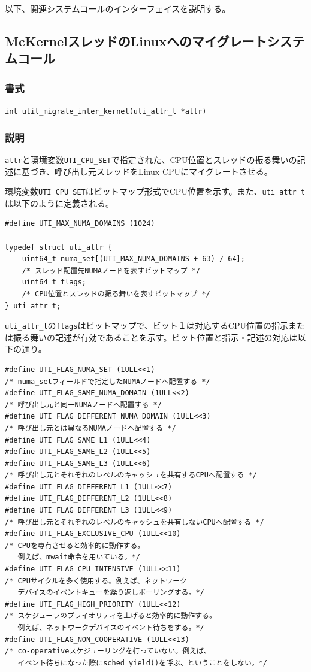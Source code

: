 \documentclass[twoside,11pt,fleqn]{book}
\begin{document}
以下、関連システムコールのインターフェイスを説明する。

\subsection{McKernelスレッドのLinuxへのマイグレートシステムコール}
\subsubsection*{書式}{\quad} \texttt{int util\_migrate\_inter\_kernel(uti\_attr\_t *attr)}
\subsubsection*{説明}{\quad}
\texttt{attr}と環境変数\texttt{UTI\_CPU\_SET}で指定された、CPU位置とスレッドの振る舞いの記述に基づき、呼び出し元スレッドをLinux CPUにマイグレートさせる。

環境変数\texttt{UTI\_CPU\_SET}はビットマップ形式でCPU位置を示す。また、\texttt{uti\_attr\_t}は以下のように定義される。
\small
\begin{verbatim}
#define UTI_MAX_NUMA_DOMAINS (1024)

typedef struct uti_attr {
    uint64_t numa_set[(UTI_MAX_NUMA_DOMAINS + 63) / 64];
    /* スレッド配置先NUMAノードを表すビットマップ */
    uint64_t flags;
    /* CPU位置とスレッドの振る舞いを表すビットマップ */
} uti_attr_t;
\end{verbatim}
\normalsize

\texttt{uti\_attr\_t}の\texttt{flags}はビットマップで、ビット１は対応するCPU位置の指示または振る舞いの記述が有効であることを示す。ビット位置と指示・記述の対応は以下の通り。
\small
\begin{verbatim}
#define UTI_FLAG_NUMA_SET (1ULL<<1)
/* numa_setフィールドで指定したNUMAノードへ配置する */
#define UTI_FLAG_SAME_NUMA_DOMAIN (1ULL<<2)
/* 呼び出し元と同一NUMAノードへ配置する */
#define UTI_FLAG_DIFFERENT_NUMA_DOMAIN (1ULL<<3)
/* 呼び出し元とは異なるNUMAノードへ配置する */
#define UTI_FLAG_SAME_L1 (1ULL<<4)
#define UTI_FLAG_SAME_L2 (1ULL<<5)
#define UTI_FLAG_SAME_L3 (1ULL<<6)
/* 呼び出し元とそれぞれのレベルのキャッシュを共有するCPUへ配置する */
#define UTI_FLAG_DIFFERENT_L1 (1ULL<<7)
#define UTI_FLAG_DIFFERENT_L2 (1ULL<<8)
#define UTI_FLAG_DIFFERENT_L3 (1ULL<<9)
/* 呼び出し元とそれぞれのレベルのキャッシュを共有しないCPUへ配置する */
#define UTI_FLAG_EXCLUSIVE_CPU (1ULL<<10)
/* CPUを専有させると効率的に動作する。
   例えば、mwait命令を用いている。*/
#define UTI_FLAG_CPU_INTENSIVE (1ULL<<11)
/* CPUサイクルを多く使用する。例えば、ネットワーク
   デバイスのイベントキューを繰り返しポーリングする。*/
#define UTI_FLAG_HIGH_PRIORITY (1ULL<<12)
/* スケジューラのプライオリティを上げると効率的に動作する。
   例えば、ネットワークデバイスのイベント待ちをする。*/
#define UTI_FLAG_NON_COOPERATIVE (1ULL<<13)
/* co-operativeスケジューリングを行っていない。例えば、
   イベント待ちになった際にsched_yield()を呼ぶ、ということをしない。*/
\end{verbatim}
\normalsize
\end{document}
